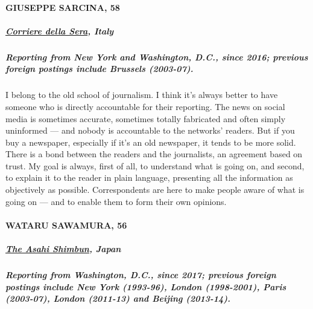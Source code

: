 \hypertarget{giuseppe-sarcina-58}{%
\paragraph{GIUSEPPE SARCINA, 58}\label{giuseppe-sarcina-58}}

\hypertarget{corriere-della-sera-italy}{%
\subparagraph{\texorpdfstring{\textbf{\href{https://www.corriere.it/}{Corriere
della Sera},
Italy}}{Corriere della Sera, Italy}}\label{corriere-della-sera-italy}}

\hypertarget{reporting-from-new-york-and-washington-dc-since-2016-previous-foreign-postings-include-brussels-2003-07}{%
\subparagraph{\texorpdfstring{\textbf{Reporting from New York and
Washington, D.C., since 2016; previous foreign postings include Brussels
(2003-07).}}{Reporting from New York and Washington, D.C., since 2016; previous foreign postings include Brussels (2003-07).}}\label{reporting-from-new-york-and-washington-dc-since-2016-previous-foreign-postings-include-brussels-2003-07}}

I belong to the old school of journalism. I think it's always better to
have someone who is directly accountable for their reporting. The news
on social media is sometimes accurate, sometimes totally fabricated and
often simply uninformed --- and nobody is accountable to the networks'
readers. But if you buy a newspaper, especially if it's an old
newspaper, it tends to be more solid. There is a bond between the
readers and the journalists, an agreement based on trust. My goal is
always, first of all, to understand what is going on, and second, to
explain it to the reader in plain language, presenting all the
information as objectively as possible. Correspondents are here to make
people aware of what is going on --- and to enable them to form their
own opinions.

\hypertarget{wataru-sawamura-56}{%
\paragraph{WATARU SAWAMURA, 56}\label{wataru-sawamura-56}}

\hypertarget{the-asahi-shimbun-japan}{%
\subparagraph{\texorpdfstring{\textbf{\href{http://www.asahi.com/ajw/}{The
Asahi Shimbun},
Japan}}{The Asahi Shimbun, Japan}}\label{the-asahi-shimbun-japan}}

\hypertarget{reporting-from-washington-dc-since-2017-previous-foreign-postings-include-new-york-1993-96-london-1998-2001-paris-2003-07-london-2011-13-and-beijing-2013-14}{%
\subparagraph{\texorpdfstring{\textbf{Reporting from Washington, D.C.,
since 2017; previous foreign postings include New York (1993-96), London
(1998-2001), Paris (2003-07), London (2011-13) and Beijing
(2013-14).}}{Reporting from Washington, D.C., since 2017; previous foreign postings include New York (1993-96), London (1998-2001), Paris (2003-07), London (2011-13) and Beijing (2013-14).}}\label{reporting-from-washington-dc-since-2017-previous-foreign-postings-include-new-york-1993-96-london-1998-2001-paris-2003-07-london-2011-13-and-beijing-2013-14}}

